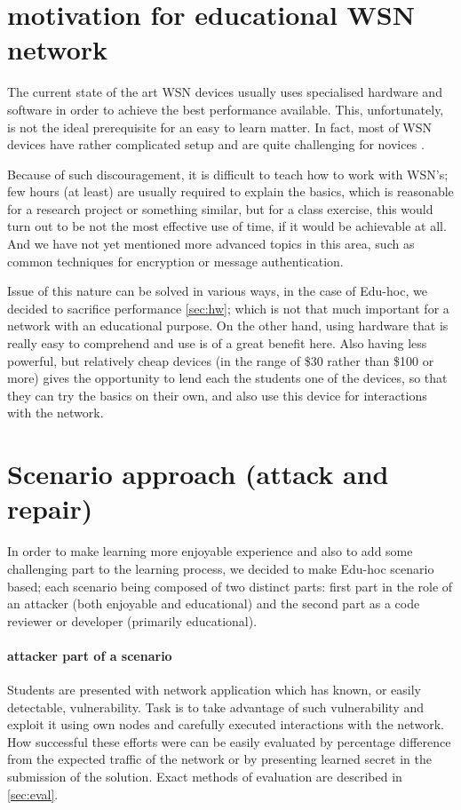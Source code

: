 \documentclass[
  print, %
  Table,   %
  nolof,     %
  nolot,     %
           oneside
]{fithesis3}
\begin{document}
  \section{motivation for educational WSN network}
  The current state of the art WSN devices usually uses specialised hardware and software in order to achieve the best performance available. %
  This, unfortunately, is not the ideal prerequisite for an easy to learn matter. In fact, most of WSN devices have rather complicated setup and are quite challenging for novices \cite{hu2010wireless}.

  Because of such discouragement, it is difficult to teach how to
  work with WSN’s; few hours (at least) are usually required
  to explain the basics, which is reasonable for a research project or
  something similar, but for a class exercise, this would turn out to be
  not the most effective use of time, if it would be achievable at all. And
  we have not yet mentioned more advanced topics in this area, such as
  common techniques for encryption or message authentication.

  Issue of this nature can be solved in various ways,
  in the case of Edu-hoc, we decided to sacrifice performance \ref{sec:hw}; which is not that much important for a network with an educational purpose. On the other hand, using hardware that is really easy to comprehend and use is of a great benefit here. Also having less powerful, but relatively cheap devices (in the range of \$30 rather than \$100 or more) gives the opportunity to lend each the students one of the devices, so that they can try the basics on their own, and also use this device for interactions with the network.

  \section{Scenario approach (attack and repair)}
  In order to make learning more enjoyable experience and also to add some challenging part to the learning process, we decided to make Edu-hoc scenario based; each scenario being composed of two distinct parts: first part in the role of an attacker (both enjoyable and educational) and the second part as a code reviewer or developer (primarily educational).

  \paragraph{attacker part of a scenario}\label{par:att}
    Students are presented with network application which has known, or easily detectable, vulnerability. Task is to take advantage of such vulnerability and exploit it using own nodes and carefully executed interactions with the network. How successful these efforts were can be easily evaluated by percentage difference from the expected traffic of the network or by presenting learned secret in the submission of the solution. Exact methods of evaluation are described in \ref{sec:eval}.
\end{document}
